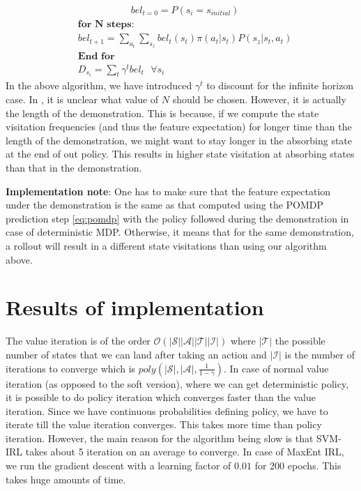 \documentclass{article}[11pt]
\begin{document}
\begin{align}
\label{eq:pomdp}
&bel_{t=0} = P(s_i = s_{initial}) 
\end{align} 
\begin{align*} 
&\textbf{for N steps:} \\
&bel_{t+1} = \sum_{a_t}\sum_{s_z}bel_t(s_t)\pi(a_t|s_t)P(s_z|s_t,a_t) \\
&\textbf{End for} \\
&D_{s_i} = \sum_t \gamma^t bel_t \ \ \ \forall s_i
\end{align*} 
In the above algorithm, we have introduced $\gamma^t$ to discount for the infinite horizon case. In \cite{ziebart2008maximum}, it is unclear what value of $N$ should be chosen. However, it is actually the length of the demonstration. This is because, if we compute the state visitation frequencies (and thus the feature expectation) for longer time than the length of the demonstration, we might want to stay longer in the absorbing state at the end of out policy. This results in higher state visitation at absorbing states than that in the demonstration. 

\textbf{Implementation note}: One has to make sure that the feature expectation under the demonstration is the same as that computed using the POMDP prediction step \ref{eq:pomdp} with the policy followed during the demonstration in case of deterministic MDP. Otherwise, it means that for the same demonstration, a rollout will result in a different state visitations than using our algorithm above.

 
\section{Results of implementation}

The value iteration is of the order $\mathcal{O}(|\mathcal{S}||\mathcal{A}||\mathcal{T}||\mathcal{I}|)$ where $|\mathcal{T}|$ the possible number of states that we can land after taking an action and $|\mathcal{I}|$ is the number of iterations to converge which is $poly(|\mathcal{S}|,|\mathcal{A}|, \frac{1}{1-\gamma})$. In case of normal value iteration (as opposed to the soft version), where we can get deterministic policy, it is possible to do policy iteration which converges faster than the value iteration. Since we have continuous probabilities defining policy, we have to iterate till the value iteration converges. This takes more time than policy iteration. However, the main reason for the algorithm being slow is that  SVM-IRL takes about 5 iteration on an average to converge. In case of MaxEnt IRL, we run the gradient descent with a learning factor of $0.01$ for $200$ epochs. This takes huge amounts of time. 
\end{document}
